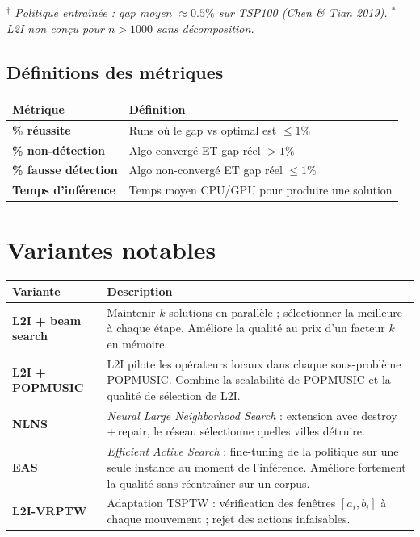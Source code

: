 \documentclass[11pt,a4paper]{article}
\begin{document}
\textit{$^\dagger$ Politique entraînée : gap moyen $\approx 0.5\%$ sur TSP100
(Chen \& Tian 2019). $^*$ L2I non conçu pour $n > 1000$ sans décomposition.}

\subsection*{Définitions des métriques}

\begin{center}
\begin{tabularx}{\textwidth}{lX}
  \toprule
  Métrique & Définition \\
  \midrule
  \textbf{\% réussite}         & Runs où le gap vs optimal est $\leq 1\%$ \\
  \textbf{\% non-détection}    & Algo convergé ET gap réel $> 1\%$ \\
  \textbf{\% fausse détection} & Algo non-convergé ET gap réel $\leq 1\%$ \\
  \textbf{Temps d'inférence}   & Temps moyen CPU/GPU pour produire une solution \\
  \bottomrule
\end{tabularx}
\end{center}

\section{Variantes notables}

\begin{center}
\begin{tabularx}{\textwidth}{lX}
  \toprule
  Variante & Description \\
  \midrule
  \textbf{L2I + beam search} &
    Maintenir $k$ solutions en parallèle ; sélectionner la meilleure à
    chaque étape. Améliore la qualité au prix d'un facteur $k$ en mémoire. \\
  \textbf{L2I + POPMUSIC} &
    L2I pilote les opérateurs locaux dans chaque sous-problème POPMUSIC.
    Combine la scalabilité de POPMUSIC et la qualité de sélection de L2I. \\
  \textbf{NLNS} &
    \textit{Neural Large Neighborhood Search} : extension avec
    destroy\,+\,repair, le réseau sélectionne quelles villes détruire. \\
  \textbf{EAS} &
    \textit{Efficient Active Search} : fine-tuning de la politique sur une
    seule instance au moment de l'inférence. Améliore fortement la qualité
    sans réentraîner sur un corpus. \\
  \textbf{L2I-VRPTW} &
    Adaptation TSPTW : vérification des fenêtres $[a_i, b_i]$ à chaque
    mouvement ; rejet des actions infaisables. \\
  \bottomrule
\end{tabularx}
\end{center}
\end{document}
